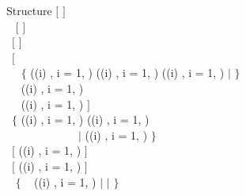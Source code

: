 \begin{DataStructure}{Structure }\label{table:descresini1}
$[$   $]$\\
~\moc{:::}  $[$  $]$   \\
~$[$ \moc{:::}    $]$ \\
~$[$       \\
~~  $\{$ ((i) ,  i = 1, )  ((i) ,  i = 1, )  ((i) ,  i = 1, ) $|$  $\}$ \\
~~  ((i) ,  i = 1, ) \\
~~  ((i) ,  i = 1, ) $]$ \\
~$\{$   ((i) ,  i = 1, )  ((i) ,  i = 1, ) \\
~~~~~~~~~~~~~$|$  ((i) ,  i = 1, ) $\}$ \\
~$[$    ((i) ,  i = 1, ) $]$ \\
~$[$   ((i) ,  i = 1, ) $]$ \\
~ $\{$  ~
((i) ,  i = 1, ) $|$  $|$  $\}$ \\
~\\
\end{DataStructure}

